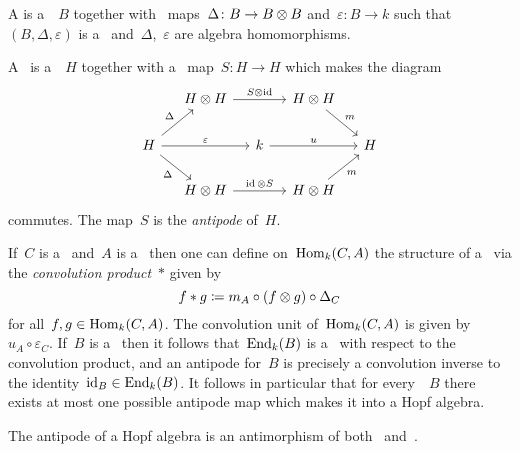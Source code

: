 \begin{definition}
  A \emph{} is a~~$B$ together with~ maps~$\Delta \colon B \to B \mathbin{\otimes} B$ and~$\varepsilon \colon B \to k$ such that~$(B,\Delta,\varepsilon)$ is a~ and~$\Delta$,~$\varepsilon$ are algebra homomorphisms.
\end{definition}


\begin{definition}
  A~ is a~~$H$ together with a~ map~$S \colon H \to H$ which makes the diagram
  \[
    \begin{tikzcd}[column sep = small]
        {}
      & H \tensor H
        \arrow{rr}[above]{S \tensor \id}
      & {}
      & H \tensor H
        \arrow{dr}[above right]{m}
      & {}
      \\
        H
        \arrow{ur}[above left]{\Delta}
        \arrow{rr}[above]{\varepsilon}
        \arrow{dr}[below left]{\Delta}
      & {}
      & k
        \arrow{rr}[above]{u}
      & {}
      & H
      \\
        {}
      & H \tensor H
        \arrow{rr}[above]{\id \tensor S}
      & {}
      & H \tensor H
        \arrow{ur}[below right]{m}
      & {}
    \end{tikzcd}
  \]
  commutes.
  The map~$S$ is the \emph{antipode} of~$H$.
\end{definition}


\begin{remark}
  If~$C$ is a~ and~$A$ is a~ then one can define on~$\operatorname{Hom}_k(C,A)$ the structure of a~ via the \emph{convolution product}~$*$ given by
  \[
              f * g
    \coloneqq  m_A \circ (f \mathbin{\otimes} g) \circ \Delta_C
  \]
  for all~$f, g \in \operatorname{Hom}_k(C,A)$.
  The convolution unit of~$\operatorname{Hom}_k(C,A)$ is given by~$u_A \circ \varepsilon_C$.
  If~$B$ is a~ then it follows that~$\operatorname{End}_k(B)$ is a~ with respect to the convolution product, and an antipode for~$B$ is precisely a convolution inverse to the identity~$\operatorname{id}_B \in \operatorname{End}_k(B)$.
  It follows in particular that for every~~$B$ there exists at most one possible antipode map which makes it into a Hopf algebra.
  
  The antipode of a Hopf algebra is an antimorphism of both~ and~.
\end{remark}


